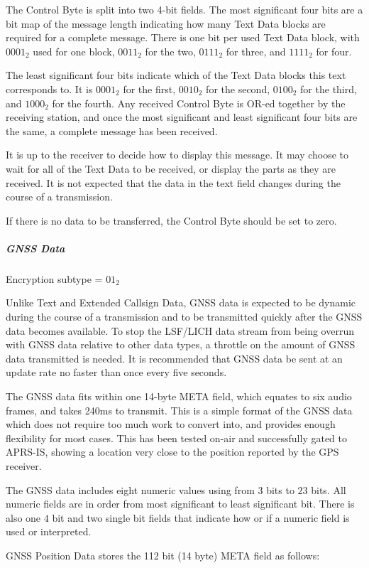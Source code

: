 \documentclass[a4paper,11pt,oneside]{book}
\begin{document}
The Control Byte is split into two 4-bit fields. The most significant four bits are a bit map of the message length indicating how many Text Data blocks are required for a complete message. There is one bit per used Text Data block, with $0001_2$ used for one block, $0011_2$ for the two, $0111_2$ for three, and $1111_2$ for four.

The least significant four bits indicate which of the Text Data blocks this text corresponds to. It is $0001_2$ for the first, $0010_2$ for the second, $0100_2$ for the third, and $1000_2$ for the fourth. Any received Control Byte is OR-ed together by the receiving station, and once the most significant and least significant four bits are the same, a complete message has been received.

It is up to the receiver to decide how to display this message. It may choose to wait for all of the Text Data to be received, or display the parts as they are received. It is not expected that the data in the text field changes during the course of a transmission.

If there is no data to be transferred, the Control Byte should be set to zero.

\subparagraph{GNSS Data}

Encryption subtype = $01_2$

Unlike Text and Extended Callsign Data, GNSS data is expected to be dynamic during the course of a transmission and to be transmitted quickly after the GNSS data becomes available. To stop the LSF/LICH data stream from being overrun with GNSS data relative to other data types, a throttle on the amount of GNSS data transmitted is needed. It is recommended that GNSS data be sent at an update rate no faster than once every five seconds.

The GNSS data fits within one 14-byte META field, which equates to six audio frames, and takes 240ms to transmit. This is a simple format of the GNSS data which does not require too much work to convert into, and provides enough flexibility for most cases. This has been tested on-air and successfully gated to APRS-IS, showing a location very close to the position reported by the GPS receiver.

The GNSS data includes eight numeric values using from $3$ bits to $23$ bits. All numeric fields are in order from most significant to least significant bit. There is also one $4$ bit and two single bit fields that indicate how or if a numeric field is used or interpreted.

GNSS Position Data stores the 112 bit (14 byte) META field as follows:
\end{document}
